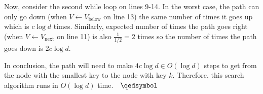 Now, consider the second while loop on lines 9-14. In the worst case, the path can only go down (when $V \gets V_\text{below}$ on line 13) the same number of times it goes up which is $c\log d$ times.
Similarly, expected number of times the path goes right (when $V \gets V_\text{next}$ on line 11) is also $\frac{1}{1/2} = 2$ times so the number of times the path goes down is $2c\log d$.

In conclusion, the path will need to make $4c\log d \in O(\log d)$ steps to get from the node with the smallest key to the node with key $k$. Therefore, this search algorithm runs in $O(\log d)$ time.$\quad\qedsymbol$
